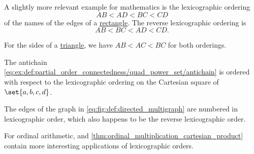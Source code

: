 \begin{example}
\begin{thmenum}
     A slightly more relevant example for mathematics is the lexicographic ordering
    \begin{equation*}
      AB < AD < BC < CD
    \end{equation*}
    of the names of the edges of a \hyperref[def:parallelogram/rectangle]{rectangle}. The reverse lexicographic ordering is
    \begin{equation*}
      AB < BC < AD < CD.
    \end{equation*}

     For the sides of a \hyperref[def:triangle]{triangle}, we have \( AB < AC < BC \) for both orderings.

     The antichain \eqref{eq:ex:def:partial_order_connectedness/quad_power_set/antichain} is ordered with respect to the lexicographic ordering on the Cartesian square of \( \set{ a, b, c, d } \).

     The edges of the graph in \eqref{eq:fig:def:directed_multigraph} are numbered in lexicographic order, which also happens to be the reverse lexicographic order.

     For ordinal arithmetic,  and \cref{thm:ordinal_multiplication_cartesian_product} contain more interesting applications of lexicographic orders.
  \end{thmenum}
\end{example}
